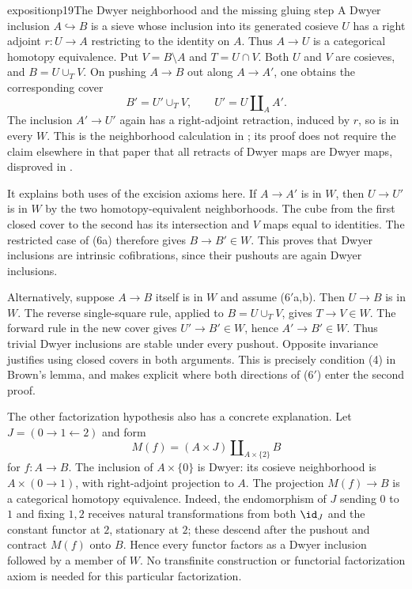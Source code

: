 \begin{dcomment}{exposition}{p19}{The Dwyer neighborhood and the missing gluing step}
A Dwyer inclusion $A\hookrightarrow B$ is a sieve whose inclusion into its generated cosieve $U$ has a right adjoint $r:U\to A$ restricting to the identity on $A$. Thus $A\to U$ is a categorical homotopy equivalence. Put $V=B\setminus A$ and $T=U\cap V$. Both $U$ and $V$ are cosieves, and $B=U\cup_T V$. On pushing $A\to B$ out along $A\to A'$, one obtains the corresponding cover
\[
B'=U'\cup_T V,\qquad U'=U\amalg_A A'.
\]
The inclusion $A'\to U'$ again has a right-adjoint retraction, induced by $r$, so is in every $W$. This is the neighborhood calculation in \citet[Definition 4.1 and Proposition 4.3, pp.~313--317]{Thomason1980}; its proof does not require the claim elsewhere in that paper that all retracts of Dwyer maps are Dwyer maps, disproved in \citet{Cisinski1999Dwyer}.

It explains both uses of the excision axioms here. If $A\to A'$ is in $W$, then $U\to U'$ is in $W$ by the two homotopy-equivalent neighborhoods. The cube from the first closed cover to the second has its intersection and $V$ maps equal to identities. The restricted case of (6a) therefore gives $B\to B'\in W$. This proves that Dwyer inclusions are intrinsic cofibrations, since their pushouts are again Dwyer inclusions.

Alternatively, suppose $A\to B$ itself is in $W$ and assume (6$'$a,b). Then $U\to B$ is in $W$. The reverse single-square rule, applied to $B=U\cup_T V$, gives $T\to V\in W$. The forward rule in the new cover gives $U'\to B'\in W$, hence $A'\to B'\in W$. Thus trivial Dwyer inclusions are stable under every pushout. Opposite invariance justifies using closed covers in both arguments. This is precisely condition (4) in Brown's lemma, and makes explicit where both directions of (6$'$) enter the second proof.

The other factorization hypothesis also has a concrete explanation. Let $J=(0\to1\leftarrow2)$ and form
\[
M(f)=(A\times J)\amalg_{A\times\{2\}}B
\]
for $f:A\to B$. The inclusion of $A\times\{0\}$ is Dwyer: its cosieve neighborhood is $A\times(0\to1)$, with right-adjoint projection to $A$. The projection $M(f)\to B$ is a categorical homotopy equivalence. Indeed, the endomorphism of $J$ sending $0$ to $1$ and fixing $1,2$ receives natural transformations from both $\id_J$ and the constant functor at $2$, stationary at $2$; these descend after the pushout and contract $M(f)$ onto $B$. Hence every functor factors as a Dwyer inclusion followed by a member of $W$. No transfinite construction or functorial factorization axiom is needed for this particular factorization.
\end{dcomment}

